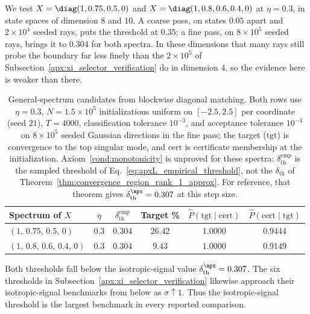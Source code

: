 \documentclass{article}
\begin{document}
We test $X=\diag(1,0.75,0.5,0)$ and
$X=\diag(1,0.8,0.6,0.4,0)$ at $\eta=0.3$, in state spaces of dimension $8$ and
$10$. A coarse pass, on states $0.05$ apart and $2\times10^4$ seeded
rays, puts the threshold at $0.35$; a fine pass, on $8\times10^5$ seeded rays,
brings it to $0.304$ for both spectra. In these dimensions that many rays
still probe the boundary far less finely than the $2\times10^5$ of
Subsection~\ref{apx:xi_selector_verification} do in dimension $4$, so the
evidence here is weaker than there.

\begin{table}[t]
    \centering
    \caption{General-spectrum candidates from blockwise diagonal matching.
    Both rows use $\eta=0.3$, $N=1.5\times10^5$ initializations uniform on
    $[-2.5,2.5]$ per coordinate (seed $21$), $T=4000$, classification tolerance
    $10^{-3}$, and acceptance tolerance $10^{-4}$ on $8\times10^5$ seeded
    Gaussian directions in the fine pass; the target ($\mathrm{tgt}$) is
    convergence to the top singular mode, and $\mathrm{cert}$ is certificate
    membership at the initialization. Axiom~\ref{cond:monotonicity}
    is unproved for these spectra: $\delta_{\mathrm{th}}^{\mathrm{emp}}$ is the
    sampled threshold of Eq.~\eqref{eq:apxL_empirical_threshold}, not the
    $\delta_{\mathrm{th}}$ of Theorem~\ref{thm:convergence_region_rank_1_approx}.
    For reference, that theorem gives $\delta_\mathrm{th}^\apx=0.307$ at this
    step size.}
    \label{tab:general_spectrum}
    \small
    \begin{tabular}{lccccc}
        \toprule
        Spectrum of $X$ & $\eta$
        & $\delta_{\mathrm{th}}^{\mathrm{emp}}$
        & Target \%
        & $\widehat P(\text{tgt}\mid\text{cert})$
        & $\widehat P(\text{cert}\mid\text{tgt})$ \\
        \midrule
        $(1,\,0.75,\,0.5,\,0)$ & $0.3$ & $0.304$
            & $26.42$ & $1.0000$ & $0.9444$ \\
        $(1,\,0.8,\,0.6,\,0.4,\,0)$ & $0.3$ & $0.304$
            & $9.43$ & $1.0000$ & $0.9149$ \\
        \bottomrule
    \end{tabular}
\end{table}

Both thresholds fall below the isotropic-signal value
$\delta_\mathrm{th}^\apx=0.307$. The six thresholds in
Subsection~\ref{apx:xi_selector_verification} likewise approach their
isotropic-signal benchmarks from below as $\sigma\uparrow1$. Thus the
isotropic-signal threshold is the largest benchmark in every reported
comparison.
\end{document}
